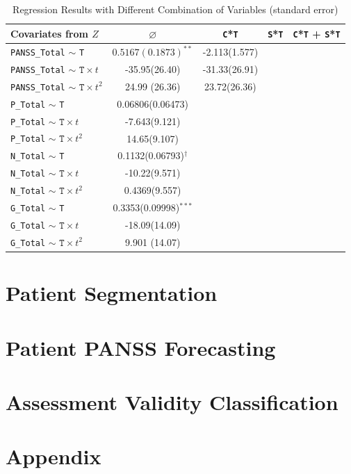 \documentclass[11pt]{article}
\begin{document}
	\begin{table}[H]
	\centering
	\begin{tabular}{l|c|c|c|c}
		Covariates from $Z$ & $\varnothing$ & \texttt{C}*\texttt{T} & \texttt{S}*\texttt{T} & \texttt{C}*\texttt{T} + \texttt{S}*\texttt{T}\\
		\hline
		\texttt{PANSS\_Total} $\sim$ \texttt{T}& $0.5167(0.1873)^{**}$& -2.113(1.577)& & \\
		\texttt{PANSS\_Total} $\sim$ $\texttt{T} \times t$ & -35.95(26.40)& -31.33(26.91)& & \\
		\texttt{PANSS\_Total} $\sim$ $\texttt{T} \times t^2$ & 24.99 (26.36) & 23.72(26.36)& & \\
		\hline 
		\texttt{P\_Total} $\sim$ \texttt{T}& 0.06806(0.06473)&  & & \\
		\texttt{P\_Total} $\sim$ $\texttt{T} \times t$ & -7.643(9.121) & & & \\
		\texttt{P\_Total} $\sim$ $\texttt{T} \times t^2$ & 14.65(9.107)& & & \\
		\hline
		\texttt{N\_Total} $\sim$ \texttt{T}& 0.1132(0.06793)$^\dagger$&  & & \\
		\texttt{N\_Total} $\sim$ $\texttt{T} \times t$ & -10.22(9.571)& & & \\
		\texttt{N\_Total} $\sim$ $\texttt{T} \times t^2$ & 0.4369(9.557)& & & \\
		\hline
		\texttt{G\_Total} $\sim$ \texttt{T}&  0.3353(0.09998)$^{***}$&  & & \\
		\texttt{G\_Total} $\sim$ $\texttt{T} \times t$ & -18.09(14.09) & & & \\
		\texttt{G\_Total} $\sim$ $\texttt{T} \times t^2$ & 9.901 (14.07)& & & \\
	\end{tabular}
	\caption{Regression Results with Different Combination of Variables (standard error)}
	\end{table}

	
	\section{Patient Segmentation}
	\section{Patient PANSS Forecasting}
	\section{Assessment Validity Classification}
	
	\section{Appendix}
\end{document}
